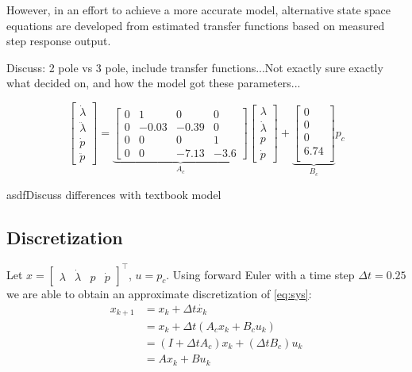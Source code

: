 However, in an effort to achieve a more accurate model, alternative state space equations are developed from estimated transfer functions based on measured step response output.

Discuss: 2 pole vs 3 pole, include transfer functions...Not exactly sure exactly what decided on, and how the model got these parameters...

\begin{equation}
	\begin{bmatrix}
		\dot{\lambda}\\
		\ddot{\lambda}\\
		\dot{p}\\
		\ddot{p}
	\end{bmatrix} = 
	\underbrace{
	\begin{bmatrix}
		0 & 1 & 0 & 0 \\
		0 & -0.03 & -0.39 & 0 \\
		0 & 0 & 0 & 1 \\
		0 & 0 & -7.13 & -3.6
	\end{bmatrix}}_{A_c}
	\begin{bmatrix}
		\lambda	\\
		\dot{\lambda}		\\
		p		\\
		\dot{p}
	\end{bmatrix} +
	\underbrace{
	\begin{bmatrix}
		0 \\
		0 \\
		0 \\
		6.74 \\
	\end{bmatrix}}_{B_c}
	p_c
	\label{eq:sys}
\end{equation}

asdfDiscuss differences with textbook model

\subsection{Discretization}
Let $x = \begin{bmatrix}\lambda&\dot{\lambda}&p&\dot{p}\end{bmatrix}^\top$, $u = p_c$. Using forward Euler with a time step $\Delta t = 0.25$ we are able to obtain an approximate discretization of \eqref{eq:sys}:
\begin{subequations}
\label{eq:dmodel}
\begin{align}
	x_{k+1} &= x_k + \Delta t \dot{x_k} \\
			&= x_k + \Delta t (A_c x_k + B_c u_k)\\
			&= (I + \Delta t A_c) x_k + (\Delta t B_c) u_k \\
			&= A x_k + B u_k
\end{align}
\end{subequations}

